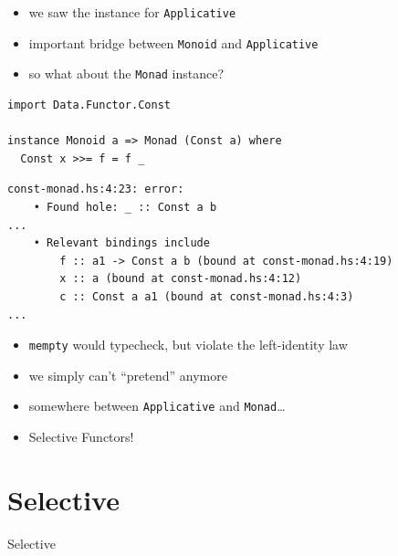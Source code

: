 \documentclass[aspectratio=169]{beamer}
\begin{document}
\begin{frame}[fragile]
  \begin{itemize}
  \item we saw the instance for \texttt{Applicative}
  \item important bridge between \texttt{Monoid} and \texttt{Applicative}
  \item so what about the \texttt{Monad} instance?
  \end{itemize}
\end{frame}

\begin{frame}[fragile]
  \begin{verbatim}
import Data.Functor.Const

instance Monoid a => Monad (Const a) where
  Const x >>= f = f _
  \end{verbatim}
  \begin{verbatim}
const-monad.hs:4:23: error:
    • Found hole: _ :: Const a b
...
    • Relevant bindings include
        f :: a1 -> Const a b (bound at const-monad.hs:4:19)
        x :: a (bound at const-monad.hs:4:12)
        c :: Const a a1 (bound at const-monad.hs:4:3)
...
  \end{verbatim}
  \begin{itemize}
  \item \texttt{mempty} would typecheck, but violate the left-identity law
  \item we simply can't ``pretend'' anymore
  \end{itemize}
\end{frame}

\begin{frame}[fragile]
  \begin{itemize}
  \item somewhere between \texttt{Applicative} and \texttt{Monad}\ldots
  \item Selective Functors!
  \end{itemize}
\end{frame}

\section{Selective}
\begin{frame}
  \begin{center}
    \Huge Selective
  \end{center}
\end{frame}
\end{document}
